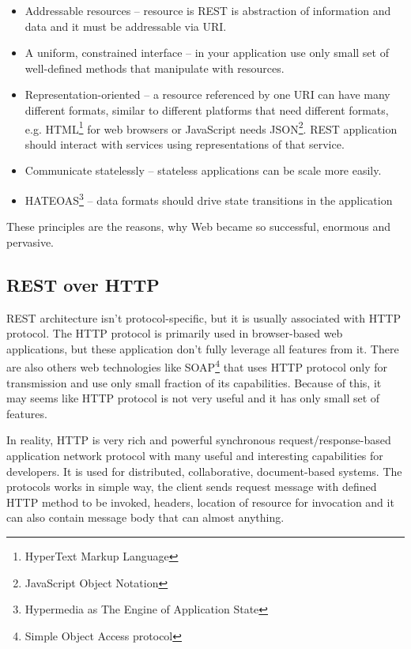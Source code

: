 \documentclass[12pt,final,oneside]{fithesis2}
\begin{document}
\begin{itemize}
\item
Addressable resources -- resource is REST is abstraction of information and data and it must be addressable via URI.

\item
A uniform, constrained interface -- in your application use only small set of well-defined methods that manipulate with resources.

\item
Representation-oriented -- a resource referenced by one URI can have many different formats, similar to different platforms that need different formats, e.g. HTML\footnote{HyperText Markup Language} for web browsers or JavaScript needs JSON\footnote{JavaScript Object Notation}. REST application should interact with services using representations of that service. 

\item
Communicate statelessly -- stateless applications can be scale more easily.

\item
HATEOAS\footnote{Hypermedia as The Engine of Application State} -- data formats should drive state transitions in the application

\end{itemize}

These principles are the reasons, why Web became so successful, enormous and pervasive.\cite{resteasy-book}

\subsection{REST over HTTP}
REST architecture isn't protocol-specific, but it is usually associated with HTTP protocol. The HTTP protocol is primarily used in browser-based web applications, but these application don't fully leverage all features from it. There are also others web technologies like SOAP\footnote{Simple Object Access protocol} that uses HTTP protocol only for transmission and use only small fraction of its capabilities. Because of this, it may seems like HTTP protocol is not very useful and it has only small set of features. 

In reality, HTTP is very rich and powerful synchronous request/response-based application network protocol with many useful and interesting capabilities for developers. It is used for distributed, collaborative, document-based systems. The protocols works in simple way, the client sends request message with defined HTTP method to be invoked, headers, location of resource for invocation and it can also contain message body that can almost anything.
\end{document}

